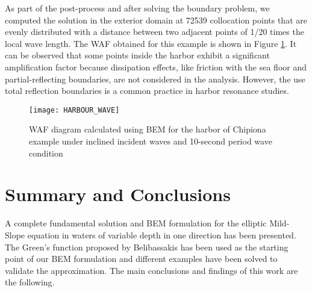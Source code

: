 As part of the post-process and after solving the boundary problem, we computed the solution in the exterior domain at 72539 collocation points that are evenly distributed with a distance between two adjacent points of 1/20 times the local wave length. The WAF obtained for this example is shown in Figure \ref{fig:HARBOUR WAVE FIELD}. It can be observed that some points inside the harbor exhibit a significant amplification factor because dissipation effects, like friction with the sea floor and partial-reflecting boundaries, are not considered in the analysis. However, the use total reflection boundaries is a common practice in harbor resonance studies.

\begin{figure}
\begin{center}
\texttt{[image: HARBOUR\_WAVE]}
\caption{WAF diagram calculated using BEM for the harbor of Chipiona example under inclined incident waves and 10-second period wave condition}
\label{fig:HARBOUR WAVE FIELD}
\end{center}
\end{figure}

\section{Summary and Conclusions}
\label{SECTION: CONCLUSION}

A complete fundamental solution and BEM formulation for the elliptic Mild-Slope equation in waters of variable depth in one direction has been presented. The Green's function proposed by Belibassakis \cite{Belibassakis2000} has been used as the starting point of our BEM formulation and different examples have been solved to validate the approximation. The main conclusions and findings of this work are the following.

